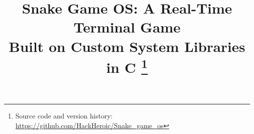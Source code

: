 \documentclass[conference]{IEEEtran}
\begin{document}
\title{Snake Game OS: A Real-Time Terminal Game\\
       Built on Custom System Libraries in C%
       \thanks{Source code and version history:
        \url{https://github.com/HackHeroic/Snake_game_os}}}

\author{
    \and
}

\maketitle
\end{document}

